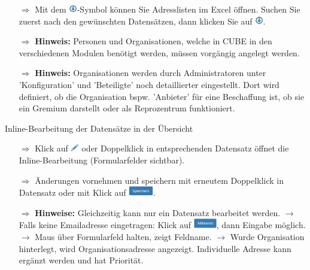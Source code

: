 \documentclass{article}
\begin{document}
\begin{multicols}{2}
\begin{tcolorbox}[colback=blue!5,colframe=blue!40!black,title=Weitere Funktionen in der Adressliste und Hinweise]
\begin{itemize}
  \item[$\Longrightarrow$] Mit dem \includegraphics[height=10pt]{Icons/ListeGenerieren.png}-Symbol können Sie Adresslisten im Excel öffnen. Suchen Sie zuerst nach den gewünschten Datensätzen, dann klicken Sie auf \includegraphics[height=10pt]{Icons/ListeGenerieren.png}.
  \item[$\Longrightarrow$] \textbf{Hinweis:} Personen und Organisationen, welche in CUBE in den verschiedenen Modulen benötigt werden, müssen vorgängig angelegt werden.
  \item[$\Longrightarrow$] \textbf{Hinweis:} Organisationen werden durch Administratoren unter 'Konfiguration' und 'Beteiligte' noch detaillierter eingestellt. Dort wird definiert, ob die Organisation bspw. 'Anbieter' für eine Beschaffung ist, ob sie ein Gremium darstellt oder als Reprozentrum funktioniert.
\end{itemize}
\end{tcolorbox}

\end{multicols}

\begin{beamerlikethm}{Inline-Bearbeitung der Datensätze in der Übersicht}
\begin{itemize}
  \item[$\Longrightarrow$] Klick auf \includegraphics[height=10pt]{Icons/Stift.png} oder Doppelklick in entsprechenden Datensatz öffnet die Inline-Bearbeitung (Formularfelder sichtbar).
  \item[$\Longrightarrow$] Änderungen vornehmen und speichern mit erneutem Doppelklick in Datensatz oder mit Klick auf \includegraphics[height=12pt]{Icons/Speichern.png}.
  \item[$\Longrightarrow$] \textbf{Hinweise:} Gleichzeitig kann nur ein Datensatz bearbeitet werden. $\rightarrow$ Falls keine Emailadresse eingetragen: Klick auf \includegraphics[height=12pt]{Icons/Aktivieren.png}, dann Eingabe möglich. $\rightarrow$ Maus über Formularfeld halten, zeigt Feldname. $\rightarrow$ Wurde Organisation hinterlegt, wird Organisationsadresse angezeigt. Individuelle Adresse kann ergänzt werden und hat Priorität.
\end{itemize}
\end{beamerlikethm}
\end{document}
